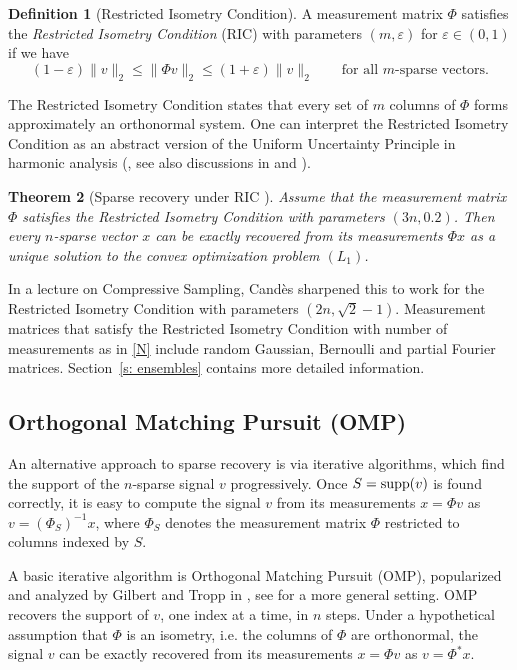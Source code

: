 \documentclass[12pt]{amsart}
\theoremstyle{plain}
\newtheorem{theorem}{Theorem}[section]
\theoremstyle{definition}
\newtheorem{definition}[theorem]{Definition}
\theoremstyle{remark}
\numberwithin{equation}{section}
\begin{document}
\begin{definition}[Restricted Isometry Condition] 
  A measurement matrix $\Phi$ satisfies the 
  {\em Restricted Isometry Condition} (RIC)
  with parameters $(m, {\varepsilon})$ for ${\varepsilon} \in (0,1)$
  if we have
  $$
  (1-{\varepsilon})\|v\|_2 \leq \|\Phi v\|_2 \leq (1+{\varepsilon})\|v\|_2
  \qquad \text{for all $m$-sparse vectors}.
  $$
\end{definition}

The Restricted Isometry Condition states that
every set of $m$ columns of $\Phi$ forms approximately an 
orthonormal system. 
One can interpret the Restricted Isometry Condition as an abstract 
version of the Uniform Uncertainty Principle in harmonic analysis
(\cite{CT}, see also discussions in \cite{CRT} and \cite{LV}).

\begin{theorem}[Sparse recovery under RIC \cite{CT decoding}]  \label{recovery RIC}
  Assume that the measurement matrix $\Phi$ satisfies the
  Restricted Isometry Condition with parameters $(3n, 0.2)$.
  Then every $n$-sparse vector $x$ can be exactly recovered from 
  its measurements $\Phi x$ as a unique solution to the convex
  optimization problem $(L_1)$.
\end{theorem}

\medskip

In a lecture on Compressive Sampling, Cand\`es sharpened this to work for the Restricted Isometry Condition 
with parameters $(2n, \sqrt{2}-1)$. Measurement matrices that satisfy the Restricted Isometry Condition 
with number of measurements as in \eqref{N} include random Gaussian, 
Bernoulli and partial Fourier matrices. 
Section~\ref{s: ensembles} contains more detailed information.

\subsection{Orthogonal Matching Pursuit (OMP)}

An alternative approach to sparse recovery is via iterative algorithms, 
which find the support of the $n$-sparse signal $v$ 
progressively. Once $S = {{\rm supp}}(v)$ is found correctly, it is easy to compute the signal $v$ 
from its measurements $x = \Phi v$ as $v = (\Phi_S)^{-1} x$, 
where $\Phi_S$ denotes the measurement matrix $\Phi$ restricted to columns indexed by $S$.

A basic iterative algorithm is Orthogonal Matching Pursuit (OMP),
popularized and analyzed by Gilbert and Tropp in \cite{TG}, see \cite{T} for a more general setting.
OMP recovers the support of $v$, one index at a time, in $n$ steps. 
Under a hypothetical assumption that $\Phi$ is an isometry, i.e. 
the columns of $\Phi$ are orthonormal, 
the signal $v$ can be exactly recovered from its measurements 
$x = \Phi v$ as $v = \Phi^* x$. 
\end{document}
